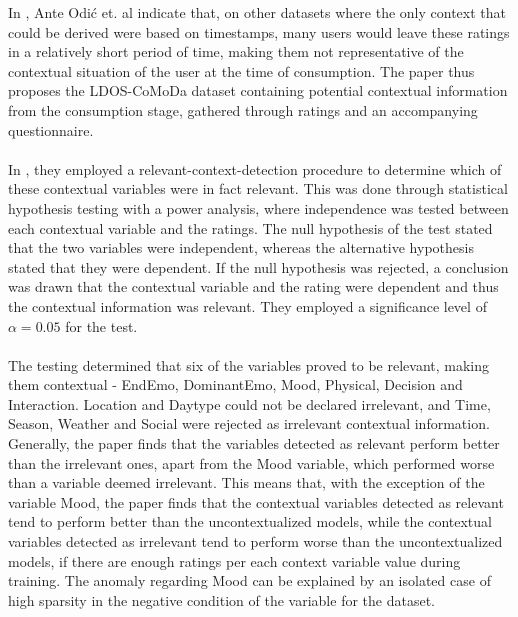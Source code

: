 In \cite{COMODA2013}, Ante Odić et. al indicate that, on other datasets where the only context that could be derived were based on timestamps, many users would leave these ratings in a relatively short period of time, making them not representative of the contextual situation of the user at the time of consumption.
The paper thus proposes the LDOS-CoMoDa dataset containing potential contextual information from the consumption stage, gathered through ratings and an accompanying questionnaire.
\\\\
In \cite{COMODA2013}, they employed a relevant-context-detection procedure to determine which of these contextual variables were in fact relevant.
This was done through statistical hypothesis testing with a power analysis, where independence was tested between each contextual variable and the ratings.
The null hypothesis of the test stated that the two variables were independent, whereas the alternative hypothesis stated that they were dependent.
If the null hypothesis was rejected, a conclusion was drawn that the contextual variable and the rating were dependent and thus the contextual information was relevant.
They employed a significance level of $\alpha = 0.05$ for the test.
\\\\
The testing determined that six of the variables proved to be relevant, making them contextual - EndEmo, DominantEmo, Mood, Physical, Decision and Interaction.
Location and Daytype could not be declared irrelevant, and Time, Season, Weather and Social were rejected as irrelevant contextual information.
Generally, the paper finds that the variables detected as relevant perform better than the irrelevant ones, apart from the Mood variable, which performed worse than a variable deemed irrelevant.
This means that, with the exception of the variable Mood, the paper finds that the contextual variables detected as relevant tend to perform better than the uncontextualized models, while the contextual variables detected as irrelevant tend to perform worse than the uncontextualized models, if there are enough ratings per each context variable value during training.
The anomaly regarding Mood can be explained by an isolated case of high sparsity in the negative condition of the variable for the dataset.

